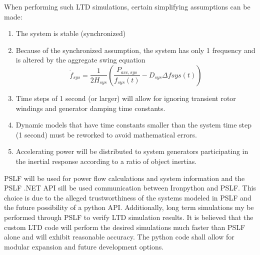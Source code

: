 \documentclass[12pt]{article}
\begin{document}
When performing such LTD simulations, certain simplifying assumptions can be made:
\begin{enumerate}
	\item The system is stable (synchronized)
	\item Because of the synchronized assumption, the system has only 1 frequency and is altered by the aggregate swing equation
	\[ \dot{f}_{sys} = \dfrac{1}{2H_{sys} } \left( \dfrac{P_{acc, sys} }{f_{sys}(t)} - D_{sys}\Delta f{sys}(t)  \right)  \]
	\item Time steps of 1 second (or larger) will allow for ignoring transient rotor windings and generator damping time constants. 
	\item Dynamic models that have time constants smaller than the system time step (1 second) must be reworked to avoid mathematical errors.
	\item Accelerating power will be distributed to system generators participating in the inertial response according to a ratio of object inertias.
\end{enumerate}

PSLF will be used for power flow calculations and system information and the PSLF .NET API sill be used communication between Ironpython and PSLF. This choice is due to the alleged trustworthiness of the systems modeled in PSLF and the future possibility of a python API. Additionally, long term simulations my be performed through PSLF to verify LTD simulation results. It is believed that the custom LTD code will perform the desired simulations much faster than PSLF alone and will exhibit reasonable accuracy. The python code shall allow for modular expansion and future development options.

\pagebreak
\end{document}
